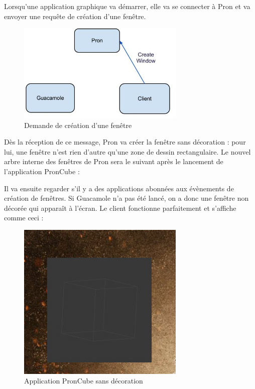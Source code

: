 Lorsqu'une application graphique va démarrer, elle va se connecter à Pron et va envoyer une requête de création d'une fenêtre.

\begin{figure}[H]
  \centering
  \includegraphics[width=8cm]{images/Guacamole_anim_2.jpg}
  \caption{Demande de création d'une fenêtre}
  \label{fig:guacamole_anim_2}
\end{figure}

Dès la réception de ce message, Pron va créer la fenêtre sans décoration : pour lui, une fenêtre n'est rien d'autre qu'une zone de dessin rectangulaire.
Le nouvel arbre interne des fenêtres de Pron sera le suivant après le lancement de l'application PronCube :

\begin{center}
\end{center}

Il va ensuite regarder s'il y a des applications abonnées aux évènements de création de fenêtres.
Si Guacamole n'a pas été lancé, on a donc une fenêtre non décorée qui apparaît à l'écran.
Le client fonctionne parfaitement et s'affiche comme ceci :

\begin{figure}[H]
  \centering
  \includegraphics[width=8cm]{images/pron_cube_sans_decoration.jpg}
  \caption{Application PronCube sans décoration}
  \label{fig:pron_cube_sans_decoration}
\end{figure}

